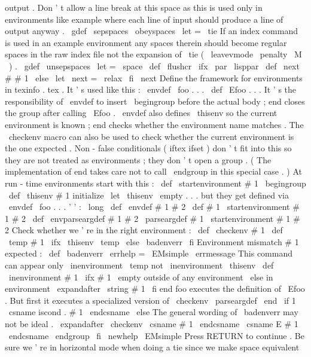 {{output
.
Don
'
t
allow
a
line
break
at
this
space
as
this
%
is
used
only
in
environments
like
example
where
each
line
of
input
%
should
produce
a
line
of
output
anyway
.
%
\
gdef
\
sepspaces
{
\
obeyspaces
\
let
=
\
tie
}
%
If
an
index
command
is
used
in
an
example
environment
any
spaces
%
therein
should
become
regular
spaces
in
the
raw
index
file
not
the
%
expansion
of
\
tie
(
\
leavevmode
\
penalty
\
M
\
)
.
\
gdef
\
unsepspaces
{
\
let
=
\
space
}
}
\
def
\
flushcr
{
\
ifx
\
par
\
lisppar
\
def
\
next
#
#
1
{
}
\
else
\
let
\
next
=
\
relax
\
fi
\
next
}
%
Define
the
framework
for
environments
in
texinfo
.
tex
.
It
'
s
used
like
this
:
%
%
\
envdef
\
foo
{
.
.
.
}
%
\
def
\
Efoo
{
.
.
.
}
%
%
It
'
s
the
responsibility
of
\
envdef
to
insert
\
begingroup
before
the
%
actual
body
;
end
closes
the
group
after
calling
\
Efoo
.
\
envdef
also
%
defines
\
thisenv
so
the
current
environment
is
known
;
end
checks
%
whether
the
environment
name
matches
.
The
\
checkenv
macro
can
also
be
%
used
to
check
whether
the
current
environment
is
the
one
expected
.
%
%
Non
-
false
conditionals
(
iftex
ifset
)
don
'
t
fit
into
this
so
they
%
are
not
treated
as
environments
;
they
don
'
t
open
a
group
.
(
The
%
implementation
of
end
takes
care
not
to
call
\
endgroup
in
this
%
special
case
.
)
%
At
run
-
time
environments
start
with
this
:
\
def
\
startenvironment
#
1
{
\
begingroup
\
def
\
thisenv
{
#
1
}
}
%
initialize
\
let
\
thisenv
\
empty
%
.
.
.
but
they
get
defined
via
\
envdef
\
foo
{
.
.
.
}
'
'
:
\
long
\
def
\
envdef
#
1
#
2
{
\
def
#
1
{
\
startenvironment
#
1
#
2
}
}
\
def
\
envparseargdef
#
1
#
2
{
\
parseargdef
#
1
{
\
startenvironment
#
1
#
2
}
}
%
Check
whether
we
'
re
in
the
right
environment
:
\
def
\
checkenv
#
1
{
%
\
def
\
temp
{
#
1
}
%
\
ifx
\
thisenv
\
temp
\
else
\
badenverr
\
fi
}
%
Environment
mismatch
#
1
expected
:
\
def
\
badenverr
{
%
\
errhelp
=
\
EMsimple
\
errmessage
{
This
command
can
appear
only
\
inenvironment
\
temp
not
\
inenvironment
\
thisenv
}
%
}
\
def
\
inenvironment
#
1
{
%
\
ifx
#
1
\
empty
outside
of
any
environment
%
\
else
in
environment
\
expandafter
\
string
#
1
%
\
fi
}
%
end
foo
executes
the
definition
of
\
Efoo
.
%
But
first
it
executes
a
specialized
version
of
\
checkenv
%
\
parseargdef
\
end
{
%
\
if
1
\
csname
iscond
.
#
1
\
endcsname
\
else
%
The
general
wording
of
\
badenverr
may
not
be
ideal
.
\
expandafter
\
checkenv
\
csname
#
1
\
endcsname
\
csname
E
#
1
\
endcsname
\
endgroup
\
fi
}
\
newhelp
\
EMsimple
{
Press
RETURN
to
continue
.
}
%
Be
sure
we
'
re
in
horizontal
mode
when
doing
a
tie
since
we
make
space
%
equivalent
}

